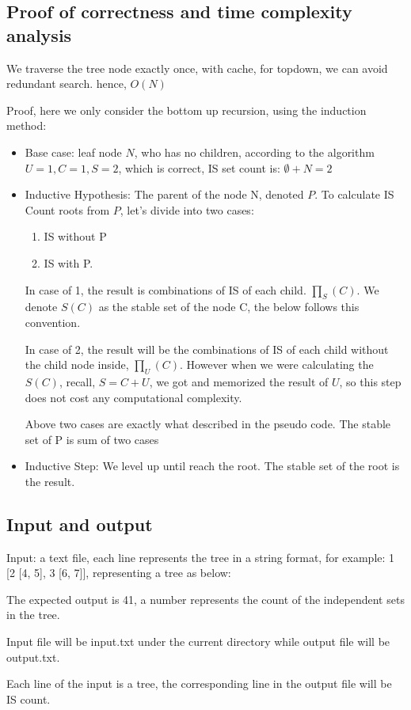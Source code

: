 \documentclass{article}
\begin{document}
\subsection*{Proof of correctness and time complexity analysis}
We traverse the tree node exactly once, with cache, for topdown, we can avoid redundant search. hence, $O(N)$

Proof, here we only consider the bottom up recursion, using the induction method:
\begin{itemize}
  \item Base case: leaf node $N$, who has no children, according to the algorithm $U=1, C=1, S=2$, which is correct, IS set count is: $\emptyset + N = 2$ 
  \item Inductive Hypothesis: The parent of the node N, denoted $P$. To calculate IS Count roots from $P$, let's divide into two cases: 
    \begin{enumerate}
      \item IS without P
      \item IS with P. 
    \end{enumerate}

    In case of 1, the result is combinations of IS of each child. $\prod_S(C)$. We denote $S(C)$ as the stable set of the node C, the below follows this convention.

    In case of 2, the result will be the combinations of IS of each child without the child node inside, $\prod_U(C)$. However when we were calculating the $S(C)$, recall, $S= C + U$, we got and memorized the result of $U$, so this step does not cost any computational complexity. 

    Above two cases are exactly what described in the pseudo code.
    The stable set of P is sum of two cases
  \item Inductive Step: We level up until reach the root. The stable set of the root is the result.
  \end{itemize}


\subsection*{Input and output}
Input: a text file, each line represents the tree in a string format, for example: 1 [2 [4, 5], 3 [6, 7]], representing a tree as below:



The expected output is 41, a number represents the count of the independent sets in the tree. 

Input file will be input.txt under the current directory while output file will be output.txt.

Each line of the input is a tree, the corresponding line in the output file will be IS count.
\end{document}
